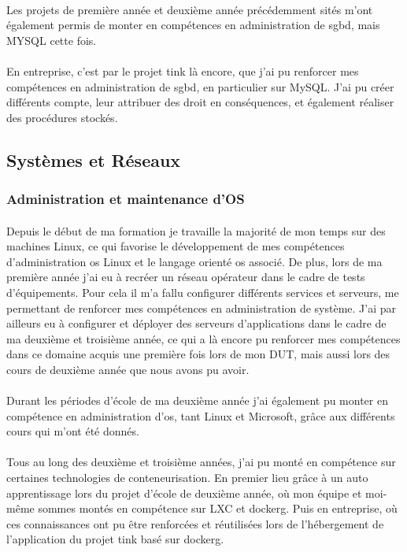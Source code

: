 \documentclass[12pt,a4paper]{report}
\begin{document}
\paragraph*{}Les projets de première année et deuxième année précédemment sités m'ont également permis de monter en compétences en administration de \gls{sgbd}, mais MYSQL cette fois.
\paragraph*{}En entreprise, c'est par le projet \gls{tink} là encore, que j'ai pu renforcer mes compétences en administration de \gls{sgbd}, en particulier sur MySQL. J'ai pu créer différents compte, leur attribuer des droit en conséquences, et également réaliser des procédures stockés. \\

\subsection{Systèmes et Réseaux}
\subsubsection{Administration et maintenance d'OS}
\paragraph*{}Depuis le début de ma formation je travaille la majorité de mon temps sur des machines Linux, ce qui favorise le développement de mes compétences d'administration \gls{os} Linux et le langage orienté \gls{os} associé. De plus, lors de ma première année j'ai eu à recréer un réseau opérateur dans le cadre de tests d'équipements. Pour cela il m'a fallu configurer différents services et serveurs, me permettant de renforcer mes compétences en administration de système. J'ai par ailleurs eu à configurer et déployer des serveurs d'applications dans le cadre de ma deuxième et troisième année, ce qui a là encore pu renforcer mes compétences dans ce domaine acquis une première fois lors de mon DUT, mais aussi lors des cours de deuxième année que nous avons pu avoir.
\paragraph*{}Durant les périodes d'école de ma deuxième année j'ai également pu monter en compétence en administration d'\gls{os}, tant Linux et Microsoft, grâce aux différents cours qui m'ont été donnés.
\paragraph*{}Tous au long des deuxième et troisième années, j'ai pu monté en compétence sur certaines technologies de conteneurisation. En premier lieu grâce à un auto apprentissage lors du projet d'école de deuxième année, où mon équipe et moi-même sommes montés en compétence sur LXC et \gls{dockerg}. Puis en entreprise, où ces connaissances ont pu être renforcées et réutilisées lors de l'hébergement de l'application du projet \gls{tink} basé sur \gls{dockerg}. \\
\end{document}
